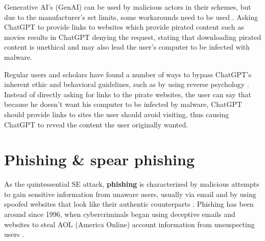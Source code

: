 Generative AI's (GenAI) can be used by malicious actors in their schemes, but due to the manufacturer's set limits, some workarounds need to be used \citep{guptaFromChatGPTtoThreatGPT2023}. Asking ChatGPT to provide links to websites which provide pirated content such as movies results in ChatGPT denying the request, stating that downloading pirated content is unethical and may also lead the user's computer to be infected with malware.

Regular users and scholars have found a number of ways to bypass ChatGPT's inherent ethic and behavioral guidelines, such as by using reverse psychology \citep{guptaFromChatGPTtoThreatGPT2023}. Instead of directly asking for links to the pirate websites, the user can say that because he doesn't want his computer to be infected by malware, ChatGPT should provide links to sites the user should avoid visiting, thus causing ChatGPT to reveal the content the user originally wanted.




\section{Phishing \& spear phishing}
\begin{comment}
    
    - 

\end{comment}


As the quintessential SE attack, \textbf{phishing} is characterized by malicious attempts to gain sensitive information from unaware users, usually via email and by using spoofed websites that look like their authentic counterparts \citep{basitComprehensiveSurveyAIenabledPhishingAttacks2021}. Phishing has been around since 1996, when cybercriminals began using deceptive emails and websites to steal AOL (America Online) account information from unsuspecting users \citep{wangDefiningSocialEngineering2020}.


